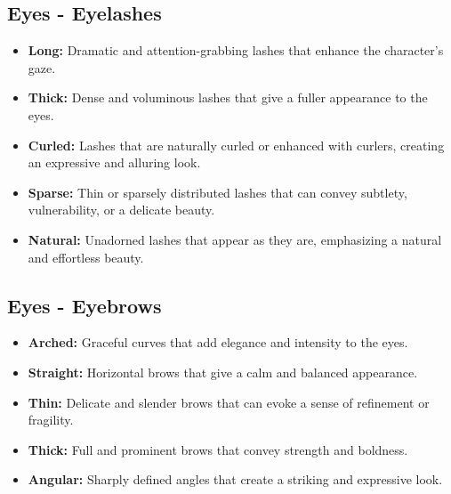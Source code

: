 \documentclass[12pt]{book}
\begin{document}
\subsection{\textbf{Eyes - Eyelashes}}

\begin{itemize}
    \item \textbf{Long:} Dramatic and attention-grabbing lashes that enhance the character's gaze.
    \item \textbf{Thick:} Dense and voluminous lashes that give a fuller appearance to the eyes.
    \item \textbf{Curled:} Lashes that are naturally curled or enhanced with curlers, creating an expressive and alluring look.
    \item \textbf{Sparse:} Thin or sparsely distributed lashes that can convey subtlety, vulnerability, or a delicate beauty.
    \item \textbf{Natural:} Unadorned lashes that appear as they are, emphasizing a natural and effortless beauty.
\end{itemize}

\subsection{\textbf{Eyes - Eyebrows}}

\begin{itemize}
    \item \textbf{Arched:} Graceful curves that add elegance and intensity to the eyes.
    \item \textbf{Straight:} Horizontal brows that give a calm and balanced appearance.
    \item \textbf{Thin:} Delicate and slender brows that can evoke a sense of refinement or fragility.
    \item \textbf{Thick:} Full and prominent brows that convey strength and boldness.
    \item \textbf{Angular:} Sharply defined angles that create a striking and expressive look.
\end{itemize}





\end{document}
